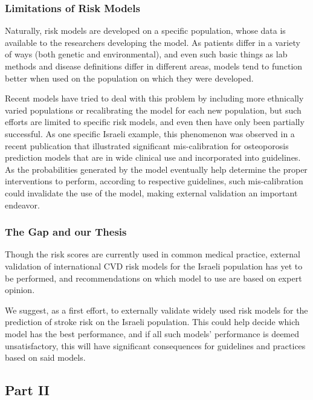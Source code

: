 \documentclass[a4paper,12pt]{article}
\begin{document}
			\subsubsection{Limitations of Risk Models}
		
			Naturally, risk models are developed on a specific population, whose data is available to the researchers developing the model. As patients differ in a variety of ways (both genetic and environmental), and even such basic things as lab methods and disease definitions differ in different areas, models tend to function better when used on the population on which they were developed\cite{DAgostino2001,Bastuji-Garin2002}.
			
			Recent models have tried to deal with this problem by including more ethnically varied populations\cite{DeFilippis2015} or recalibrating the model for each new population\cite{Kanis2008}, but such efforts are limited to specific risk models, and even then have only been partially successful\cite{Dagan2017}. As one specific Israeli example, this phenomenon was observed in a recent publication that illustrated significant mis-calibration for osteoporosis prediction models that are in wide clinical use and incorporated into guidelines\cite{Dagan2017}. As the probabilities generated by the model eventually help determine the proper interventions to perform, according to respective guidelines, such mis-calibration could invalidate the use of the model, making external validation an important endeavor\cite{Moons2012}.
			
			\subsubsection{The Gap and our Thesis}
		
			Though the risk scores are currently used in common medical practice, external validation of international CVD risk models for the Israeli population has yet to be performed, and recommendations on which model to use are based on expert opinion\cite{Bitzur2015}.
			
			We suggest, as a first effort, to externally validate widely used risk models for the prediction of stroke risk on the Israeli population. This could help decide which model has the best performance, and if all such models' performance is deemed unsatisfactory, this will have significant consequences for guidelines and practices based on said models.
		
		\subsection{Part II}
		
\end{document}
